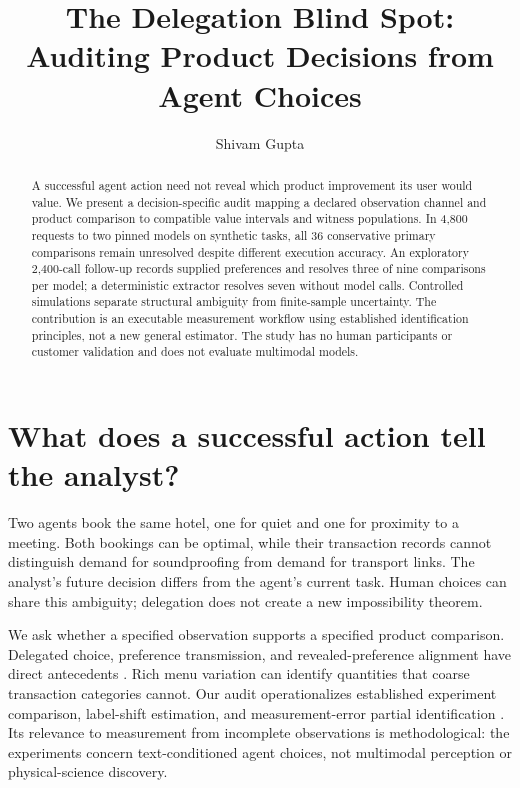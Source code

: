 \documentclass[runningheads]{llncs}
\begin{document}
\title{The Delegation Blind Spot: Auditing Product Decisions from Agent Choices}
\author{Shivam Gupta}
\maketitle
\begin{abstract}
A successful agent action need not reveal which product improvement its user would value. We present a decision-specific audit mapping a declared observation channel and product comparison to compatible value intervals and witness populations. In 4,800 requests to two pinned models on synthetic tasks, all 36 conservative primary comparisons remain unresolved despite different execution accuracy. An exploratory 2,400-call follow-up records supplied preferences and resolves three of nine comparisons per model; a deterministic extractor resolves seven without model calls. Controlled simulations separate structural ambiguity from finite-sample uncertainty. The contribution is an executable measurement workflow using established identification principles, not a new general estimator. The study has no human participants or customer validation and does not evaluate multimodal models.
\end{abstract}

\section{What does a successful action tell the analyst?}
Two agents book the same hotel, one for quiet and one for proximity to a meeting. Both bookings can be optimal, while their transaction records cannot distinguish demand for soundproofing from demand for transport links. The analyst's future decision differs from the agent's current task. Human choices can share this ambiguity; delegation does not create a new impossibility theorem.

We ask whether a specified observation supports a specified product comparison. Delegated choice, preference transmission, and revealed-preference alignment have direct antecedents \cite{kops2026,kraft2026,suleymanov2026}. Rich menu variation can identify quantities that coarse transaction categories cannot. Our audit operationalizes established experiment comparison, label-shift estimation, and measurement-error partial identification \cite{blackwell1953,lipton2018,finkelstein2021}. Its relevance to measurement from incomplete observations is methodological: the experiments concern text-conditioned agent choices, not multimodal perception or physical-science discovery.
\end{document}
